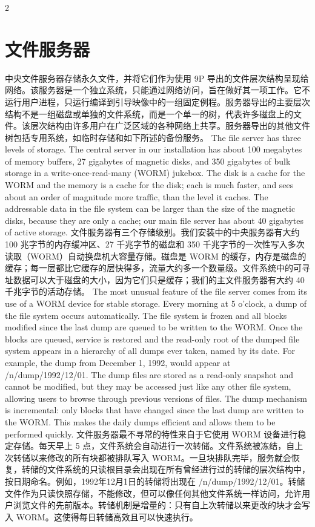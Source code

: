 \documentclass{article}
\begin{document}
\begin{paracol}{2}
\section*{文件服务器}
中央文件服务器存储永久文件，并将它们作为使用 9P 导出的文件层次结构呈现给网络。该服务器是一个独立系统，只能通过网络访问，旨在做好其一项工作。它不运行用户进程，只运行编译到引导映像中的一组固定例程。服务器导出的主要层次结构不是一组磁盘或单独的文件系统，而是一个单一的树，代表许多磁盘上的文件。该层次结构由许多用户在广泛区域的各种网络上共享。服务器导出的其他文件树包括专用系统，如临时存储和如下所述的备份服务。
\switchcolumn*
The file server has three levels of storage. The central server in our installation has about 100 megabytes of memory buffers, 27 gigabytes of magnetic disks, and 350 gigabytes of bulk storage in a write-once-read-many (WORM) jukebox. The disk is a cache for the WORM and the memory is a cache for the disk; each is much faster, and sees about an order of magnitude more traffic, than the level it caches. The addressable data in the file system can be larger than the size of the magnetic disks, because they are only a cache; our main file server has about 40 gigabytes of active storage.
\switchcolumn
文件服务器有三个存储级别。我们安装中的中央服务器有大约 100 兆字节的内存缓冲区、27 千兆字节的磁盘和 350 千兆字节的一次性写入多次读取（WORM）自动换盘机大容量存储。磁盘是 WORM 的缓存，内存是磁盘的缓存；每一层都比它缓存的层快得多，流量大约多一个数量级。文件系统中的可寻址数据可以大于磁盘的大小，因为它们只是缓存；我们的主文件服务器有大约 40 千兆字节的活动存储。
\switchcolumn*
The most unusual feature of the file server comes from its use of a WORM device for stable storage. Every morning at 5 o'clock, a dump of the file system occurs automatically. The file system is frozen and all blocks modified since the last dump are queued to be written to the WORM. Once the blocks are queued, service is restored and the read-only root of the dumped file system appears in a hierarchy of all dumps ever taken, named by its date. For example, the dump from December 1, 1992, would appear at /n/dump/1992/12/01. The dump files are stored as a read-only snapshot and cannot be modified, but they may be accessed just like any other file system, allowing users to browse through previous versions of files. The dump mechanism is incremental: only blocks that have changed since the last dump are written to the WORM. This makes the daily dumps efficient and allows them to be performed quickly.
\switchcolumn
文件服务器最不寻常的特性来自于它使用 WORM 设备进行稳定存储。每天早上 5 点，文件系统会自动进行一次转储。文件系统被冻结，自上次转储以来修改的所有块都被排队写入 WORM。一旦块排队完毕，服务就会恢复，转储的文件系统的只读根目录会出现在所有曾经进行过的转储的层次结构中，按日期命名。例如，1992年12月1日的转储将出现在 /n/dump/1992/12/01。转储文件作为只读快照存储，不能修改，但可以像任何其他文件系统一样访问，允许用户浏览文件的先前版本。转储机制是增量的：只有自上次转储以来更改的块才会写入 WORM。这使得每日转储高效且可以快速执行。

\end{paracol}
\end{document}
